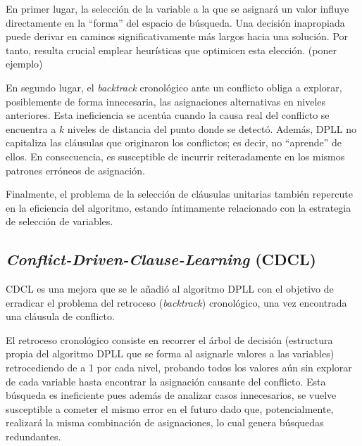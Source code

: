En primer lugar, la selección de la variable a la que se asignará un valor influye directamente en la ``forma'' del espacio de búsqueda. Una decisión inapropiada puede derivar en caminos significativamente más largos hacia una solución. Por tanto, resulta crucial emplear heurísticas que optimicen esta elección. (poner ejemplo)

En segundo lugar, el \textit{backtrack} cronológico ante un conflicto obliga a explorar, posiblemente de forma innecesaria, las asignaciones alternativas en niveles anteriores. Esta ineficiencia se acentúa cuando la causa real del conflicto se encuentra a $k$ niveles de distancia del punto donde se detectó. Además, DPLL no capitaliza las cláusulas que originaron los conflictos; es decir, no ``aprende'' de ellos. En consecuencia, es susceptible de incurrir reiteradamente en los mismos patrones erróneos de asignación.

Finalmente, el problema de la selección de cláusulas unitarias también repercute en la eficiencia del algoritmo, estando íntimamente relacionado con la estrategia de selección de variables.



\subsection{\textit{Conflict-Driven-Clause-Learning} (CDCL)}
\label{subsection:cdcl}

CDCL es una mejora que se le a\~nadi\'o al algoritmo DPLL con el objetivo de erradicar el problema del retroceso (\textit{backtrack}) cronol\'ogico, una vez encontrada una cl\'ausula de conflicto.

El retroceso cronol\'ogico consiste en recorrer el \'arbol de decisi\'on (estructura propia del algoritmo DPLL que se forma al asignarle valores a las variables) retrocediendo de a 1 por cada nivel, probando todos los valores a\'un sin explorar de cada variable hasta encontrar la asignaci\'on causante del conflicto. Esta b\'usqueda es ineficiente pues adem\'as de analizar casos innecesarios, se vuelve susceptible a cometer el mismo error en el futuro dado que, potencialmente, realizar\'a la misma combinaci\'on de asignaciones, lo cual genera b\'usquedas redundantes.

